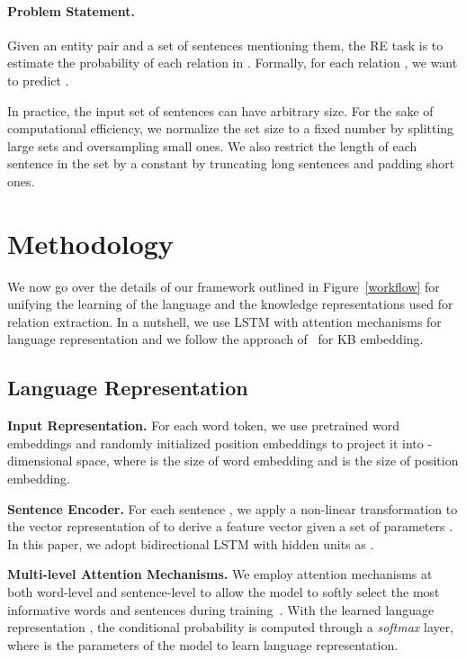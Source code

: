 \documentclass[11pt,a4paper]{article}
\begin{document}
\paragraph*{Problem Statement.}

Given an entity pair  and a set of sentences  mentioning them, the RE task is to estimate the probability of each relation in .
Formally, for each relation , we want to predict .

In practice, the input set of sentences  can have arbitrary size. 
For the sake of computational efficiency, we normalize the set size to a fixed number  by splitting large sets and oversampling small ones. 
We also restrict the length of each sentence in the set by a constant  by truncating long sentences and padding short ones.  
\section{Methodology}


We now go over the details of our framework outlined in Figure~\ref{workflow} for unifying the learning of the language and the knowledge representations used for relation extraction. 
In a nutshell, we use LSTM with attention mechanisms for language representation and we follow the approach of~ for KB embedding.




\subsection{Language Representation}



\textbf{Input Representation.}
For each word token, we use pretrained word embeddings and randomly initialized position embeddings \cite{zeng2014relation} to project it into -dimensional space, where  is the size of word embedding and  is the size of position embedding.

\noindent \textbf{Sentence Encoder.}
For each sentence , we apply a non-linear transformation to the vector representation of  to derive a feature vector  given a set of parameters .
In this paper, we adopt bidirectional LSTM with  hidden units as  \cite{zhou2016attention}.


\noindent \textbf{Multi-level Attention Mechanisms.}
We employ attention mechanisms at both word-level and sentence-level to allow the model to softly select the most informative words and sentences during training~\cite{zhou2016attention,lin2016neural}.
With the learned language representation , the conditional probability  is computed through a \emph{softmax} layer, where  is the parameters of the model to learn language representation.
\end{document}
